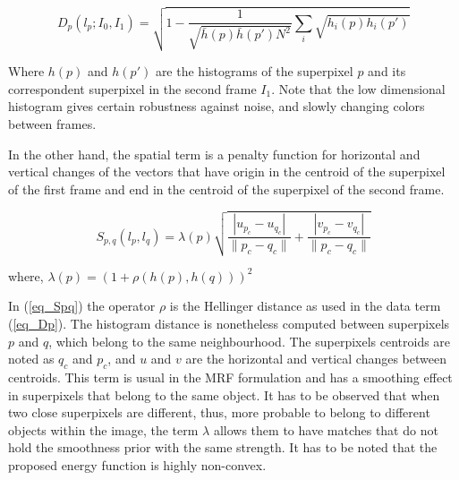 \begin{equation}
D_p(l_p;I_0,I_1) = \sqrt{ 1 - \frac{1}{\sqrt{\bar{h}(p)\bar{h}(p')N^2} } \sum_{i}\sqrt{h_{i}(p)h_{i}(p')} }
\label{eq_Dp}
\end{equation}

Where $h(p)$ and $h(p')$ are the histograms of the superpixel $p$ and its correspondent superpixel in the
second frame $I_1$. %
Note that the low dimensional histogram gives certain robustness against noise,
and slowly changing colors between frames. 

In the other hand, the spatial term is a penalty function for horizontal
and vertical changes of the vectors that have origin in the centroid of the superpixel of the first frame and
end in the centroid of the superpixel of the second frame.

\begin{equation}
S_{p,q}(l_p, l_q) = \lambda(p)
  \sqrt{\frac{|u_{p_c}-u_{q_c}|}{\|p_c-q_c\|}+ \frac{|v_{p_c}-v_{q_c}|}{\|p_c-q_c\|}}
\label{eq_Spq}
\end{equation}
\begin{center}
 where, $ \lambda(p) = (1 + \rho(h(p),h(q)))^2 $ \\
\end{center}

In (\ref{eq_Spq}) the operator $\rho$ is the Hellinger distance as used in the
data term (\ref{eq_Dp}). The histogram distance is nonetheless computed between superpixels $p$ and $q$, 
which belong to the same neighbourhood. The superpixels centroids are noted as $q_c$ and $p_c$, 
and $u$ and $v$ are the horizontal and vertical changes between centroids.
This term is usual in the MRF formulation and has a smoothing effect in superpixels that belong to the
same object. It has to be observed that when two close superpixels are different, thus, more probable to
belong to different objects within the image, the term $\lambda$ allows them to have
matches that do not hold the smoothness prior with the same strength. 
It has to be noted that the proposed energy function is highly non-convex.


